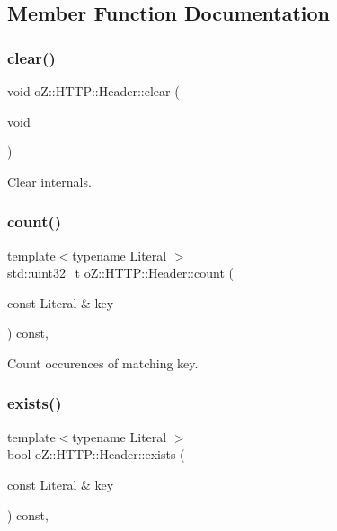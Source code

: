 \subsection{Member Function Documentation}
\mbox{\label{classo_z_1_1_h_t_t_p_1_1_header_a1cfaa8a5de62d172e3906b296a5c7e4b}} 
\subsubsection{\texorpdfstring{clear()}{clear()}}
{\footnotesize\ttfamily void o\+Z\+::\+H\+T\+T\+P\+::\+Header\+::clear (\begin{DoxyParamCaption}\item[{void}]{ }\end{DoxyParamCaption})\hspace{0.3cm}{\ttfamily [inline]}}



Clear internals. 

\mbox{\label{classo_z_1_1_h_t_t_p_1_1_header_a59d2eb480ab72b94240e8eb87cf7aee2}} 
\subsubsection{\texorpdfstring{count()}{count()}}
{\footnotesize\ttfamily template$<$typename Literal $>$ \\
std\+::uint32\+\_\+t o\+Z\+::\+H\+T\+T\+P\+::\+Header\+::count (\begin{DoxyParamCaption}\item[{const Literal \&}]{key }\end{DoxyParamCaption}) const\hspace{0.3cm}{\ttfamily [inline]}, {\ttfamily [noexcept]}}



Count occurences of matching key. 

\mbox{\label{classo_z_1_1_h_t_t_p_1_1_header_aac91315b9984871e672845f8a69cf1ef}} 
\subsubsection{\texorpdfstring{exists()}{exists()}}
{\footnotesize\ttfamily template$<$typename Literal $>$ \\
bool o\+Z\+::\+H\+T\+T\+P\+::\+Header\+::exists (\begin{DoxyParamCaption}\item[{const Literal \&}]{key }\end{DoxyParamCaption}) const\hspace{0.3cm}{\ttfamily [inline]}, {\ttfamily [noexcept]}}



